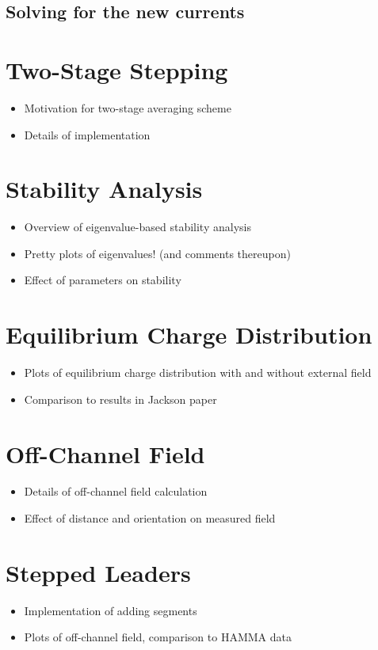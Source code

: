 \documentclass{article}
\begin{document}
\subsection{Solving for the new currents}

\section{Two-Stage Stepping}
\begin{itemize}
\item Motivation for two-stage averaging scheme
\item Details of implementation
\end{itemize}

\section{Stability Analysis}
\begin{itemize}
\item Overview of eigenvalue-based stability analysis
\item Pretty plots of eigenvalues! (and comments thereupon)
\item Effect of parameters on stability
\end{itemize}

\section{Equilibrium Charge Distribution}
\begin{itemize}
\item Plots of equilibrium charge distribution with and without external field
\item Comparison to results in Jackson paper
\end{itemize}

\section{Off-Channel Field}
\begin{itemize}
\item Details of off-channel field calculation
\item Effect of distance and orientation on measured field
\end{itemize}

\section{Stepped Leaders}
\begin{itemize}
\item Implementation of adding segments
\item Plots of off-channel field, comparison to HAMMA data
\end{itemize}
\end{document}
